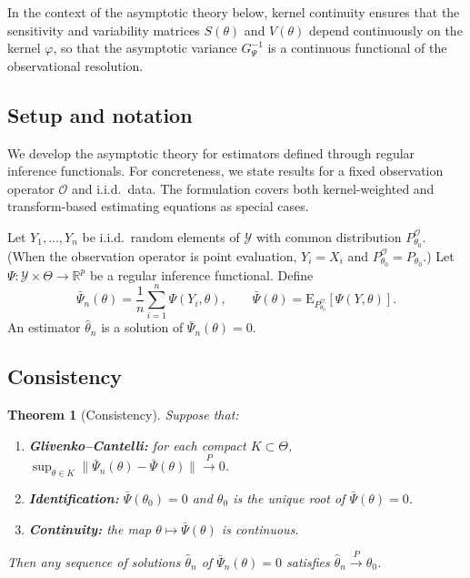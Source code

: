 \documentclass[11pt,a4paper]{article}
\newtheorem{theorem}{Theorem}[section]
\newcommand{\E}{\mathrm{E}}
\newcommand{\R}{\mathbb{R}}
\begin{document}
In the context of the asymptotic theory below, kernel continuity ensures
that the sensitivity and variability matrices $S(\theta)$ and $V(\theta)$
depend continuously on the kernel $\varphi$, so that the asymptotic
variance $G_\Psi^{-1}$ is a continuous functional of the observational
resolution.

\subsection{Setup and notation}\label{subsec:asymp-setup}

We develop the asymptotic theory for estimators defined through regular
inference functionals.  For concreteness, we state results for a fixed
observation operator $\mathcal O$ and i.i.d.\ data.  The formulation
covers both kernel-weighted and transform-based estimating equations as
special cases.

Let $Y_1, \ldots, Y_n$ be i.i.d.\ random elements of $\mathcal Y$ with
common distribution $P_{\theta_0}^{\mathcal O}$.  (When the observation
operator is point evaluation, $Y_i = X_i$ and
$P_{\theta_0}^{\mathcal O} = P_{\theta_0}$.)  Let
$\Psi : \mathcal Y \times \Theta \to \R^p$ be a regular inference
functional.  Define
\[
\bar\Psi_n(\theta)
= \frac{1}{n} \sum_{i=1}^n \Psi(Y_i, \theta),
\qquad
\bar\Psi(\theta)
= \E_{P_{\theta_0}^{\mathcal O}}[\Psi(Y, \theta)].
\]
An estimator $\hat\theta_n$ is a solution of
$\bar\Psi_n(\theta) = 0$.

\subsection{Consistency}\label{subsec:consistency}

\begin{theorem}[Consistency]\label{thm:consistency}
Suppose that:
\begin{enumerate}
\item \textbf{Glivenko--Cantelli:} for each compact $K \subset \Theta$,
$\sup_{\theta \in K} \|\bar\Psi_n(\theta) - \bar\Psi(\theta)\|
\xrightarrow{P} 0$.

\item \textbf{Identification:} $\bar\Psi(\theta_0) = 0$ and $\theta_0$ is the unique root of
$\bar\Psi(\theta) = 0$.

\item \textbf{Continuity:} the map $\theta \mapsto \bar\Psi(\theta)$ is
continuous.
\end{enumerate}
Then any sequence of solutions $\hat\theta_n$ of $\bar\Psi_n(\theta) = 0$
satisfies $\hat\theta_n \xrightarrow{P} \theta_0$.
\end{theorem}
\end{document}
